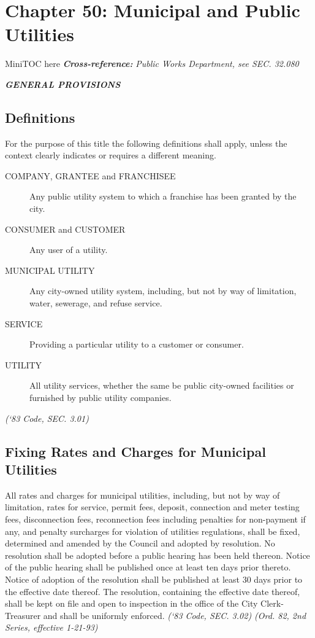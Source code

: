 \documentclass[code.tex]{subfiles}
\begin{document}
\chapter*{Chapter 50: \newline
	Municipal and Public Utilities}

MiniTOC here\newline
\textbf{\emph{{Cross-reference:}}}\newline
\emph{Public Works Department, see SEC. 32.080}
\pagebreak

\begin{center}
\textbf{\emph{\LARGE{GENERAL PROVISIONS}}}
\end{center}
\section{Definitions}
For the purpose of this title the following definitions shall apply, unless the context clearly indicates or requires a different meaning.
\begin{description}
\item[COMPANY, GRANTEE and FRANCHISEE] Any public utility system to which a franchise has been granted by the city.
\item[CONSUMER and CUSTOMER] Any user of a utility.
\item[MUNICIPAL UTILITY] Any city-owned utility system, including, but not by way of limitation, water, sewerage, and refuse service.
\item[SERVICE] Providing a particular utility to a customer or consumer.
\item[UTILITY] All utility services, whether the same be public city-owned facilities or furnished by public utility companies.
\end{description}
\emph{(‘83 Code, SEC. 3.01)}
\section{Fixing Rates and Charges for Municipal Utilities}
All rates and charges for municipal utilities, including, but not by way of limitation, rates for service, permit fees, deposit, connection and meter testing fees, disconnection fees, reconnection fees including penalties for non-payment if any, and penalty surcharges for violation of utilities regulations, shall be fixed, determined and amended by the Council and adopted by resolution.  No resolution shall be adopted before a public hearing has been held thereon.  Notice of the public hearing shall be published once at least ten days prior thereto.  Notice of adoption of the resolution shall be published at least 30 days prior to the effective date thereof.  The resolution, containing the effective date thereof, shall be kept on file and open to inspection in the office of the City Clerk-Treasurer and shall be uniformly enforced.\newline
\emph{(‘83 Code, SEC. 3.02) (Ord. 82, 2nd Series, effective 1-21-93)}
\end{document}
